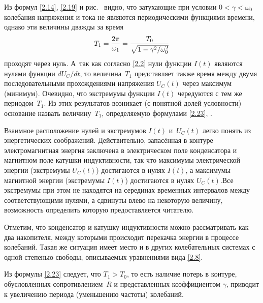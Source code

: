 \documentclass[a4paper,oneside]{book}
\begin{document}
Из формул \eqref{2.14}, \eqref{2.19} и рис.~ видно, что затухающие
при условии $0<\gamma<\omega_0$ колебания напряжения и тока не являются
периодическими функциями времени, однако эти величины дважды за время
\begin{equation}\eqmark{2.23}
T_1=\dfrac{2\pi}{\omega_1}=\dfrac{T_0}{\sqrt{1-\gamma^2/\omega_0^2}}
\end{equation}
проходят через нуль. А~так как согласно \eqref{2.2} нули функции $I(t)$ являются
нулями функции $dU_C/dt$, то величина~$T_1$ представляет также время между двумя
последовательными прохождениями напряжения $U_C(t)$ через максимум (минимум).
Очевидно, что экстремумы функции $I(t)$ чередуются с тем же периодом~$T_1$. Из
этих результатов возникает (с понятной долей условности) основание назвать
величину~$T_1$, определяемую формулами \eqref{2.23}, .

Взаимное расположение нулей и экстремумов $I(t)$ и~$U_C(t)$ легко понять из
энергетических соображений. Действительно, запасённая в контуре электромагнитная
энергия заключена в электрическом поле конденсатора и магнитном поле катушки
индуктивности, так что максимумы электрической энергии (экстремумы $U_C(t)$)
достигаются в нулях $I(t)$, а максимумы магнитной энергии (экстремумы $I(t)$)
достигаются в нулях $U_C(t)$.Все экстремумы при этом не находятся на серединах временных интервалов между соответствующими нулями, а сдвинуты влево на некоторую величину, возможность определить которую предоставляется читателю.

Отметим, что конденсатор и катушку индуктивности можно рассматривать как два накопителя, между которыми происходит перекачка энергии в процессе колебаний. Такая же ситуация имеет место и в других колебательных системах с одной степенью свободы, описываемых уравнениями вида \eqref{2.8}.

Из формулы \eqref{2.23} следует, что $T_1>T_0$, то есть наличие потерь в
контуре, обусловленных сопротивлением~$R$ и представленных коэффициентом
$\gamma$, приводит к увеличению периода (уменьшению частоты) колебаний.

\end{document}

